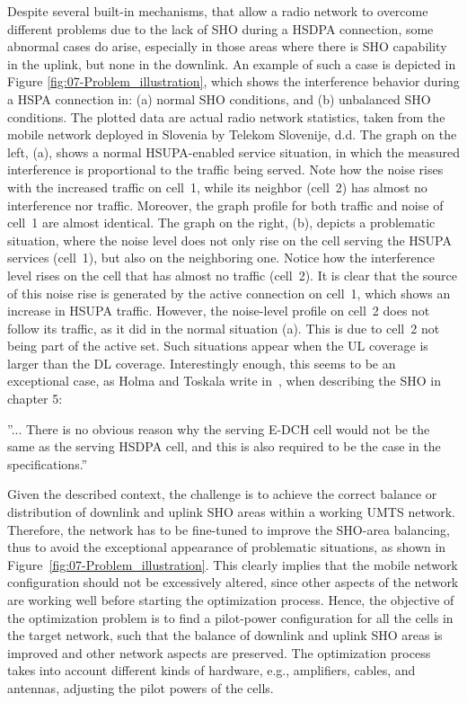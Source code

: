 Despite several built-in mechanisms, that allow a radio network to
overcome different problems due to the lack of SHO during a HSDPA
connection, some abnormal cases do arise, especially in those areas
where there is SHO capability in the uplink, but none in the downlink.
An example of such a case is depicted in Figure \ref{fig:07-Problem_illustration},
which shows the interference behavior during a HSPA connection in:
(a) normal SHO conditions, and (b) unbalanced SHO conditions. The
plotted data are actual radio network statistics, taken from the mobile
network deployed in Slovenia by Telekom Slovenije, d.d. The graph
on the left, (a), shows a normal HSUPA-enabled service situation,
in which the measured interference is proportional to the traffic
being served. Note how the noise rises with the increased traffic
on cell~1, while its neighbor (cell~2) has almost no interference
nor traffic. Moreover, the graph profile for both traffic and noise
of cell~1 are almost identical. The graph on the right, (b), depicts
a problematic situation, where the noise level does not only rise
on the cell serving the HSUPA services (cell~1), but also on the
neighboring one. Notice how the interference level rises on the cell
that has almost no traffic (cell~2). It is clear that the source
of this noise rise is generated by the active connection on cell~1,
which shows an increase in HSUPA traffic. However, the noise-level
profile on cell~2 does not follow its traffic, as it did in the normal
situation (a). This is due to cell~2 not being part of the active
set. Such situations appear when the UL coverage is larger than the
DL coverage. Interestingly enough, this seems to be an exceptional
case, as Holma and Toskala write in~\cite{holma2006hsdpa}, when
describing the SHO in chapter 5:

''... There is no obvious reason why the serving E-DCH cell would
not be the same as the serving HSDPA cell, and this is also required
to be the case in the specifications.''

Given the described context, the challenge is to achieve the correct
balance or distribution of downlink and uplink SHO areas within a
working UMTS network. Therefore, the network has to be fine-tuned
to improve the SHO-area balancing, thus to avoid the exceptional appearance
of problematic situations, as shown in Figure~\ref{fig:07-Problem_illustration}.
This clearly implies that the mobile network configuration should
not be excessively altered, since other aspects of the network are
working well before starting the optimization process. Hence, the
objective of the optimization problem is to find a pilot-power configuration
for all the cells in the target network, such that the balance of
downlink and uplink SHO areas is improved and other network aspects
are preserved. The optimization process takes into account different
kinds of hardware, e.g., amplifiers, cables, and antennas, adjusting
the pilot powers of the cells.

